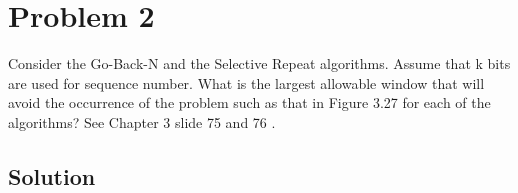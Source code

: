 
\section*{Problem 2}

Consider the Go-Back-N and the Selective Repeat algorithms.
Assume that k bits are used for sequence number.
What is the largest allowable window that will avoid the occurrence of the problem such as that in Figure 3.27 for each of the algorithms?
See Chapter 3 slide 75 and 76 .

\subsection*{Solution}
